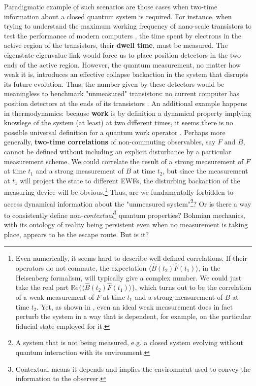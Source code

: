 \documentclass[11pt, a4paper]{article} %
\begin{document}
Paradigmatic example of such scenarios are those cases when two-time information about a closed quantum system is required. For instance, when trying to understand the maximum working frequency of nano-scale transistors to test the performance of modern computers \cite{modern}, the time spent by electrons in the active region of the transistors, their {\bf dwell time}, must be measured. The eigenstate-eigenvalue link would force us to place position detectors in the two ends of the active region. However, the quantum measurement, no matter how weak it is, introduces an effective collapse backaction in the system that disrupts its future evolution. Thus, the number given by these detectors would be meaningless to benchmark "unmeasured" transistors: no current computer has position detectors at the ends of its transistors \cite{tunnel1, tunnel2}. An additional example happens in thermodynamics: because {\bf work} is by definition a dynamical property implying knowlege of the system (at least) at two different times, it seems there is no possible universal definition for a quantum work operator \cite{nogo, workPb1, workPb2}. Perhaps more generally, {\bf two-time correlations} of non-commuting observables, say $F$ and $B$, cannot be defined without including an explicit disturbance by a particular measurement scheme. We could correlate the result of a strong measurement of $F$ at time $t_1$ and a strong measurement of $B$ at time $t_2$, but since the measurement at $t_1$ will project the state to different EWFs, the disturbing backaction of the measuring device will be obvious.\footnote{ Even numerically, it seems hard to describe well-defined correlations. If their operators do not commute, the expectation $\langle \hat{B}(t_2)\hat{F}(t_1)\rangle$, in the Heisenberg formalism, will typically give a complex number. We could just take the real part $\mathbb{R}e \big\{\langle \hat{B}(t_2)\hat{F}(t_1)\rangle\big\}$, which turns out to be the correlation of a weak measurement \cite{Weak} of $F$ at time $t_1$ and a strong measurement of $B$ at time $t_2$. Yet, as shown in \cite{DevInPosition2}, even an ideal weak measurement does in fact perturb the system in a way that is dependent, for example, on the particular fiducial state employed for it.} Thus, are we fundamentally forbidden to access dynamical information about the "unmeasured system"\footnote{A system that is not being measured, e.g. a closed system evolving without quantum interaction with its environment.}? Or is there a way to consistently define non-{\em contextual}\footnote{Contextual means it depends and implies the environment used to convey the information to the observer.} quantum properties? Bohmian mechanics, with its ontology of reality being persistent even when no measurement is taking place, appears to be the escape route. But is it?  \vspace{-0.15cm}
\end{document}
